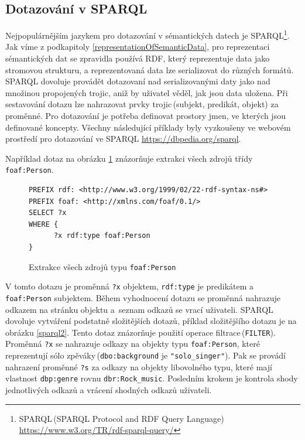 \subsection{Dotazování v SPARQL}
Nejpopulárnějším jazykem pro dotazování v sémantických datech je SPARQL\footnote{SPARQL\,(SPARQL Protocol and RDF Query Language) \href{https://www.w3.org/TR/rdf-sparql-query/}{https://www.w3.org/TR/rdf-sparql-query/}}. Jak víme z podkapitoly \ref{representationOfSemanticData}, pro reprezentaci sémantických dat se zpravidla používá RDF, který reprezentuje data jako stromovou strukturu, a reprezentovaná data lze serializovat do různých formátů. SPARQL dovoluje provádět dotazovaní nad serializovanými daty jako nad množinou propojených trojic, aniž by uživatel věděl, jak jsou data uložena. Při sestavování dotazu lze nahrazovat prvky trojic\,(subjekt, predikát, objekt) za proměnné. Pro dotazování je potřeba definovat prostory jmen, ve kterých jsou definované koncepty. Všechny následující příklady byly vyzkoušeny ve webovém prostředí pro dotazování ve SPARQL \href{https://dbpedia.org/sparql}{https://dbpedia.org/sparql}.


Například dotaz na obrázku \ref{sparql1} znázorňuje extrakci všech zdrojů třídy \texttt{foaf:Person}.
\begin{figure}[!ht]
\begin{lstlisting}[captionpos=b, label=lst:sparql, basicstyle=\ttfamily,frame=single]
PREFIX rdf: <http://www.w3.org/1999/02/22-rdf-syntax-ns#>
PREFIX foaf: <http://xmlns.com/foaf/0.1/> 
SELECT ?x	
WHERE {
      ?x rdf:type foaf:Person
} 
\end{lstlisting}
    \caption{Extrakce všech zdrojů typu \texttt{foaf:Person}}
    \label{sparql1}
\end{figure}

V tomto dotazu je proměnná \texttt{?x} objektem, \texttt{rdf:type} je predikátem a \texttt{foaf:Person} subjektem. Během vyhodnocení dotazu se proměnná nahrazuje odkazem na stránku objektu a~seznam odkazů se vrací uživateli. SPARQL dovoluje vytváření podstatně složitějších dotazů, příklad složitějšího dotazu je na obrázku \ref{sparql2}. Tento dotaz znázorňuje použití operace filtrace\,(\texttt{FILTER}). Proměnná \texttt{?x} se nahrazuje odkazy na objekty typu \texttt{foaf:Person}, které reprezentují sólo zpěváky\,(\texttt{dbo:background} je  \texttt{"solo\_singer"}). Pak se provádí nahrazení proměnné \texttt{?s} za odkazy na objekty libovolného typu, které mají vlastnost \texttt{dbp:genre}  rovnu \texttt{dbr:Rock\_music}. Posledním krokem je kontrola shody jednotlivých odkazů a vrácení shodných odkazů uživateli. 

